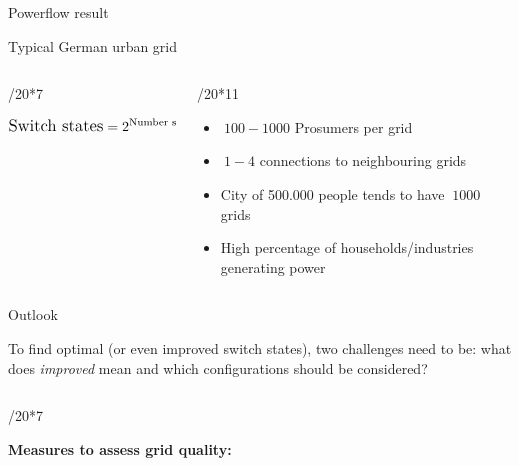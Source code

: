 \documentclass[final]{beamer}
\newlength{\colwidth}
\begin{document}
\begin{frame}[t]
\begin{columns}[t]
\begin{column}{\colwidth}
\begin{block}{Powerflow result}
 \end{block}

  \begin{exampleblock}{Typical German urban grid}

    \begin{columns}[t]
        
      \begin{column}{\colwidth/20*7}

        \begin{equation*}
          \begin{aligned}
           \large \text{Switch states} = 2^{\text{Number switches}}
          \end{aligned}
        \end{equation*}


      \end{column}

      \begin{column}{\colwidth/20*11}
        \begin{itemize}
          \item $~100-1000$ Prosumers per grid\autocite{Venios}
          \item $~1-4$ connections to neighbouring grids\autocite{Venios}
          \item City of 500.000 people tends to have $~1000$ grids\autocite{Venios}
          \item High percentage of households/industries generating power
        \end{itemize}
      \end{column}

    \end{columns}
    
    
  \end{exampleblock}

 \begin{block}{Outlook}
 
  To find optimal (or even improved switch states), two challenges need to be: what
  does \textit{improved} mean and which configurations should be considered?

  \begin{columns}[t]
          
    \begin{column}{\colwidth/20*7}

      \textbf{Measures to assess grid quality:}
    

\end{column}
\end{columns}
\end{block}
\end{column}
\end{columns}
\end{frame}
\end{document}
